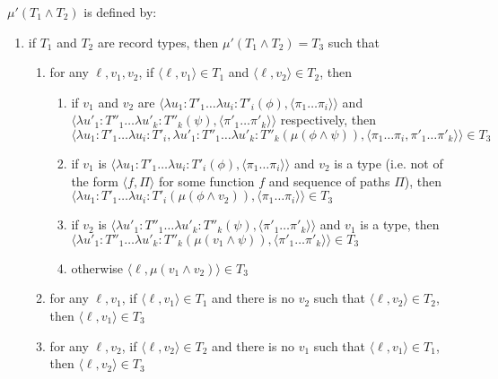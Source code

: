 $\mu'(T_1\wedge T_2)$ is defined by:
\begin{enumerate} 
 
\item if $T_1$ and $T_2$ are record types, then $\mu'(T_1\wedge
  T_2)=T_3$ such that
\begin{enumerate} 
 
\item for any $\ell,v_1,v_2$, if $\langle\ell,v_1\rangle\in T_1$ and
  $\langle\ell,v_2\rangle\in T_2$, then 

\begin{enumerate} 
 
\item if $v_1$ and $v_2$ are $\langle\lambda u_1:T'_1\ldots\lambda
  u_i:T'_i(\phi),\langle\pi_1\ldots\pi_i\rangle\rangle$ and $\langle\lambda u'_1:T''_1\ldots\lambda
  u'_k:T''_k(\psi),\langle\pi'_1\ldots\pi'_k\rangle\rangle$
  respectively, then $\langle\lambda u_1:T'_1\ldots\lambda
  u_i:T'_i,\lambda u'_1:T''_1\ldots\lambda
  u'_k:T''_k(\mu(\phi\wedge\psi)), \langle\pi_1\ldots\pi_i,\pi'_1\ldots\pi'_k\rangle\rangle\in T_3$
 
\item if $v_1$ is $\langle\lambda u_1:T'_1\ldots\lambda
  u_i:T'_i(\phi),\langle\pi_1\ldots\pi_i\rangle\rangle$ and $v_2$ is a
  type (i.e. not of the form $\langle f,\Pi\rangle$ for some function
  $f$ and sequence of paths $\Pi$), then $\langle\lambda u_1:T'_1\ldots\lambda
  u_i:T'_i(\mu(\phi\wedge
  v_2)),\langle\pi_1\ldots\pi_i\rangle\rangle\in T_3$

\item if $v_2$ is $\langle\lambda u'_1:T''_1\ldots\lambda
  u'_k:T''_k(\psi),\langle\pi'_1\ldots\pi'_k\rangle\rangle$ and $v_1$
  is a type, then $\langle\lambda u'_1:T''_1\ldots\lambda
  u'_k:T''_k(\mu(v_1\wedge\psi)),\langle\pi'_1\ldots\pi'_k\rangle\rangle\in
  T_3$

\item otherwise $\langle\ell,\mu(v_1\wedge
  v_2)\rangle\in T_3$ 
 
\end{enumerate} 
  


 
\item for any $\ell,v_1$, if $\langle\ell,v_1\rangle\in T_1$ and there
  is no $v_2$ such that $\langle\ell,v_2\rangle\in T_2$, then
  $\langle\ell,v_1\rangle\in T_3$

\item for any $\ell,v_2$, if $\langle\ell,v_2\rangle\in T_2$ and there
  is no $v_1$ such that $\langle\ell,v_1\rangle\in T_1$, then
  $\langle\ell,v_2\rangle\in T_3$
 

\end{enumerate}
\end{enumerate}
